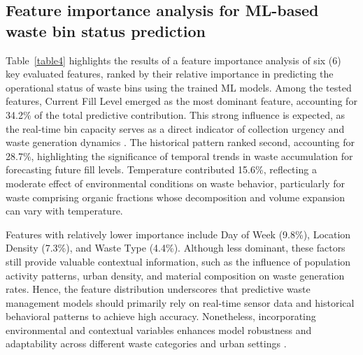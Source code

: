 \documentclass[final,5p,times,twocolumn]{elsarticle}
\begin{document}
\subsection{Feature importance analysis for ML-based waste bin status prediction}
Table~\ref{table4} highlights the results of a feature importance analysis of six (6) key evaluated features, ranked by their relative importance in predicting the operational status of waste bins using the trained ML models. Among the tested features, Current Fill Level emerged as the most dominant feature, accounting for 34.2\% of the total predictive contribution. This strong influence is expected, as the real-time bin capacity serves as a direct indicator of collection urgency and waste generation dynamics \cite{vladucu2024blockchain}. The historical pattern ranked second, accounting for 28.7\%, highlighting the significance of temporal trends in waste accumulation for forecasting future fill levels. Temperature contributed 15.6\%, reflecting a moderate effect of environmental conditions on waste behavior, particularly for waste comprising organic fractions whose decomposition and volume expansion can vary with temperature. 

Features with relatively lower importance include Day of Week (9.8\%), Location Density (7.3\%), and Waste Type (4.4\%). Although less dominant, these factors still provide valuable contextual information, such as the influence of population activity patterns, urban density, and material composition on waste generation rates. Hence, the feature distribution underscores that predictive waste management models should primarily rely on real-time sensor data and historical behavioral patterns to achieve high accuracy. Nonetheless, incorporating environmental and contextual variables enhances model robustness and adaptability across different waste categories and urban settings \cite{faiz2024blockchain}.

\begin{table}[htbp]
\centering
\caption{Feature importance rankings}
\label{table4}
\end{table}
\end{document}
